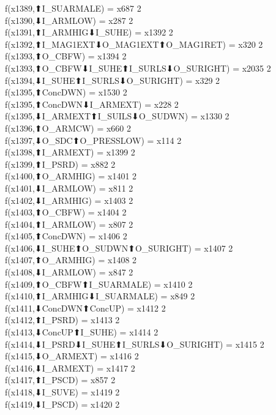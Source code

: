 f(x1389,⬆I_SUARMALE) = x687 {2} \\
f(x1390,⬇I_ARMLOW) = x287 {2} \\
f(x1391,⬆I_ARMHIG⬇I_SUHE) = x1392 {2} \\
f(x1392,⬆I_MAG1EXT⬇O_MAG1EXT⬆O_MAG1RET) = x320 {2} \\
f(x1393,⬆O_CBFW) = x1394 {2} \\
f(x1393,⬆O_CBFW⬇I_SUHE⬆I_SURLS⬇O_SURIGHT) = x2035 {2} \\
f(x1394,⬇I_SUHE⬆I_SURLS⬇O_SURIGHT) = x329 {2} \\
f(x1395,⬆ConcDWN) = x1530 {2} \\
f(x1395,⬆ConcDWN⬇I_ARMEXT) = x228 {2} \\
f(x1395,⬇I_ARMEXT⬆I_SUILS⬇O_SUDWN) = x1330 {2} \\
f(x1396,⬆O_ARMCW) = x660 {2} \\
f(x1397,⬇O_SDC⬆O_PRESSLOW) = x114 {2} \\
f(x1398,⬆I_ARMEXT) = x1399 {2} \\
f(x1399,⬆I_PSRD) = x882 {2} \\
f(x1400,⬆O_ARMHIG) = x1401 {2} \\
f(x1401,⬇I_ARMLOW) = x811 {2} \\
f(x1402,⬇I_ARMHIG) = x1403 {2} \\
f(x1403,⬆O_CBFW) = x1404 {2} \\
f(x1404,⬆I_ARMLOW) = x807 {2} \\
f(x1405,⬆ConcDWN) = x1406 {2} \\
f(x1406,⬇I_SUHE⬆O_SUDWN⬆O_SURIGHT) = x1407 {2} \\
f(x1407,⬆O_ARMHIG) = x1408 {2} \\
f(x1408,⬇I_ARMLOW) = x847 {2} \\
f(x1409,⬆O_CBFW⬆I_SUARMALE) = x1410 {2} \\
f(x1410,⬆I_ARMHIG⬇I_SUARMALE) = x849 {2} \\
f(x1411,⬇ConcDWN⬆ConcUP) = x1412 {2} \\
f(x1412,⬆I_PSRD) = x1413 {2} \\
f(x1413,⬇ConcUP⬆I_SUHE) = x1414 {2} \\
f(x1414,⬇I_PSRD⬇I_SUHE⬆I_SURLS⬇O_SURIGHT) = x1415 {2} \\
f(x1415,⬇O_ARMEXT) = x1416 {2} \\
f(x1416,⬇I_ARMEXT) = x1417 {2} \\
f(x1417,⬆I_PSCD) = x857 {2} \\
f(x1418,⬇I_SUVE) = x1419 {2} \\
f(x1419,⬇I_PSCD) = x1420 {2} \\
